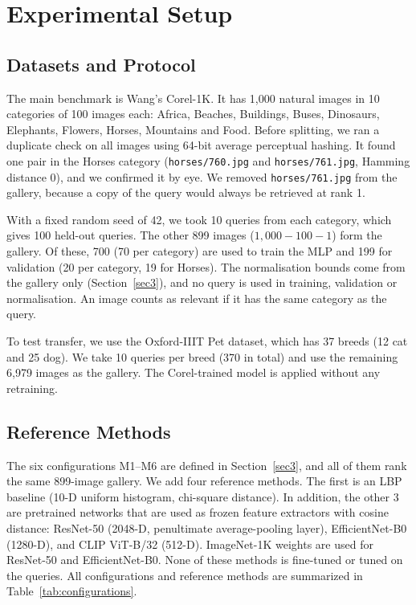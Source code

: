 \documentclass[pdflatex,sn-mathphys-num]{sn-jnl}
\begin{document}
\section{Experimental Setup}\label{sec4}
\subsection{Datasets and Protocol}\label{subsec4.1}
The main benchmark is Wang's Corel-1K. It has 1,000 natural images in 10 categories of 100 images each: Africa, Beaches, Buildings, Buses, Dinosaurs, Elephants, Flowers, Horses, Mountains and Food. Before splitting, we ran a duplicate check on all images using 64-bit average perceptual hashing. It found one pair in the Horses category (\texttt{horses/760.jpg} and \texttt{horses/761.jpg}, Hamming distance 0), and we confirmed it by eye. We removed \texttt{horses/761.jpg} from the gallery, because a copy of the query would always be retrieved at rank 1.

With a fixed random seed of 42, we took 10 queries from each category, which gives 100 held-out queries. The other 899 images ($1{,}000 - 100 - 1$) form the gallery. Of these, 700 (70 per category) are used to train the MLP and 199 for validation (20 per category, 19 for Horses). The normalisation bounds come from the gallery only (Section~\ref{sec3}), and no query is used in training, validation or normalisation. An image counts as relevant if it has the same category as the query.

To test transfer, we use the Oxford-IIIT Pet dataset, which has 37 breeds (12 cat and 25 dog). We take 10 queries per breed (370 in total) and use the remaining 6,979 images as the gallery. The Corel-trained model is applied without any retraining.

\subsection{Reference Methods}\label{subsec4.2}
The six configurations M1--M6 are defined in Section~\ref{sec3}, and all of them rank the same 899-image gallery. We add four reference methods. The first is an LBP baseline (10-D uniform histogram, chi-square distance). In addition, the other 3 are pretrained networks that are used as frozen feature extractors with cosine distance: ResNet-50 (2048-D, penultimate average-pooling layer), EfficientNet-B0 (1280-D), and CLIP ViT-B/32 (512-D). ImageNet-1K weights are used for ResNet-50 and EfficientNet-B0. None of these methods is fine-tuned or tuned on the queries. All configurations and reference methods are summarized in Table~\ref{tab:configurations}.
\end{document}
